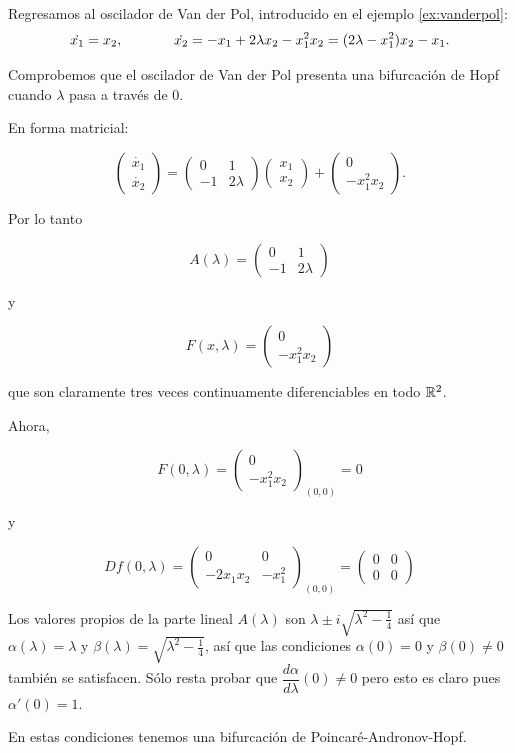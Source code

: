 \begin{example} \label{ex:vanderpol-hopf}
Regresamos al oscilador de Van der Pol, introducido en el ejemplo \ref{ex:vanderpol}:
$$
	\dot{x_1} = x_2, \hspace{0.5in} \dot{x_2} = -x_1 + 2\lambda x_2 - x_1^2 x_2 = (2\lambda - x_1^2)x_2 - x_1.
$$

Comprobemos que el oscilador de Van der Pol presenta una bifurcación de Hopf cuando $\lambda$ pasa a través de $0$.

En forma matricial:

$$
	\begin{pmatrix}\dot{x_1} \\ \dot{x_2}\end{pmatrix} =	\begin{pmatrix}0 & 1 \\ -1 & 2\lambda \end{pmatrix} \begin{pmatrix}x_1 \\ x_2 \end{pmatrix} + \begin{pmatrix} 0 \\ -x_1^2 x_2\end{pmatrix}.
$$

Por lo tanto

$$
	A(\lambda) = \begin{pmatrix}0 & 1 \\ -1 & 2\lambda \end{pmatrix}
$$

y

$$
	F(x, \lambda) = \begin{pmatrix} 0 \\ -x_1^2 x_2\end{pmatrix}
$$

que son claramente tres veces continuamente diferenciables en todo ${\mathbb{R}}^2$.

Ahora,

$$F(0, \lambda) = \begin{pmatrix}0 \\ -x_1^2x_2\end{pmatrix}_{(0,0)} = 0 $$

y

$$ Df(0, \lambda) = \begin{pmatrix} 0 & 0 \\ -2x_1x_2 & -x_1^2 \end{pmatrix}_{(0,0)} = \begin{pmatrix}0 & 0 \\ 0 & 0\end{pmatrix}$$

Los valores propios de la parte lineal $A(\lambda)$ son $\lambda \pm i\sqrt{\lambda^2 - \frac{1}{4}}$ así que $\alpha(\lambda) = \lambda$ y $\beta(\lambda) = \sqrt{\lambda^2 - \frac{1}{4}}$, así que las condiciones $\alpha(0) = 0$ y $\beta(0) \neq 0$ también se satisfacen. Sólo resta probar que $\dfrac{d \alpha}{d \lambda}(0) \neq 0$ pero esto es claro pues $\alpha'(0) = 1$.

En estas condiciones tenemos una bifurcación de Poincaré-Andronov-Hopf.
\end{example}

